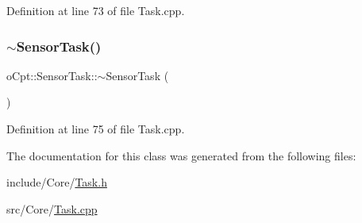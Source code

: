Definition at line 73 of file Task.\+cpp.

\hypertarget{classo_cpt_1_1_sensor_task_a10e599626f58306aa05579f2c59a9b8a}{}\label{classo_cpt_1_1_sensor_task_a10e599626f58306aa05579f2c59a9b8a} 
\subsubsection{\texorpdfstring{$\sim$\+Sensor\+Task()}{~SensorTask()}}
{\footnotesize\ttfamily o\+Cpt\+::\+Sensor\+Task\+::$\sim$\+Sensor\+Task (\begin{DoxyParamCaption}{ }\end{DoxyParamCaption})\hspace{0.3cm}{\ttfamily [virtual]}}



Definition at line 75 of file Task.\+cpp.



The documentation for this class was generated from the following files\+:\begin{DoxyCompactItemize}
\item 
include/\+Core/\hyperlink{_task_8h}{Task.\+h}\item 
src/\+Core/\hyperlink{_task_8cpp}{Task.\+cpp}\end{DoxyCompactItemize}
